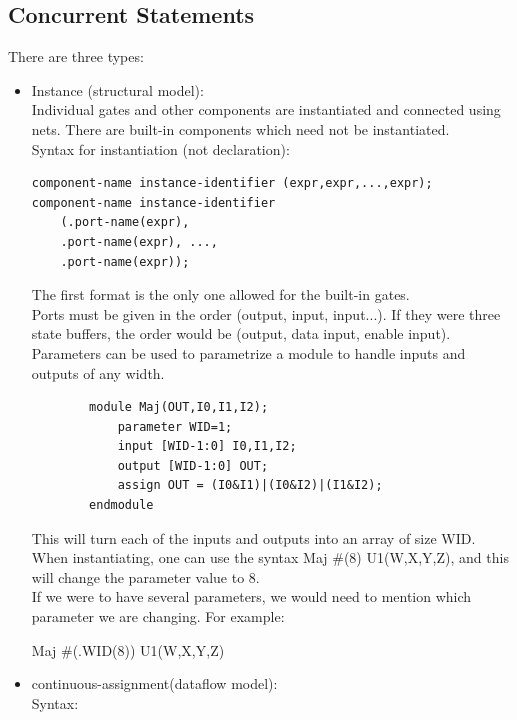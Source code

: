 \documentclass[nobib]{tufte-handout}
\begin{document}
    \subsection{Concurrent Statements}
    There are three types:\\
    \begin{itemize}
        \item Instance (structural model):\\ Individual gates and other components are
              instantiated and connected using nets. There are built-in components which need
              not be instantiated.\\ Syntax for instantiation (not declaration):
              \begin{lstlisting}
component-name instance-identifier (expr,expr,...,expr);
component-name instance-identifier
    (.port-name(expr),
    .port-name(expr), ...,
    .port-name(expr));
    \end{lstlisting}
              The first format is the only one allowed for the built-in gates.\\ Ports must
              be given in the order (output, input, input...). If they were three state
              buffers, the order would be (output, data input, enable input).\\ Parameters
              can be used to parametrize a module to handle inputs and outputs of any width.
              \begin{lstlisting}
        module Maj(OUT,I0,I1,I2);
            parameter WID=1;
            input [WID-1:0] I0,I1,I2;
            output [WID-1:0] OUT;
            assign OUT = (I0&I1)|(I0&I2)|(I1&I2);
        endmodule
    \end{lstlisting}
              This will turn each of the inputs and outputs into an array of size WID.\\ When
              instantiating, one can use the syntax Maj \#(8) U1(W,X,Y,Z), and this will
              change the parameter value to 8.\\ If we were to have several parameters, we
              would need to mention which parameter we are changing. For example:\\
              \begin{center}
                  Maj \#(.WID(8)) U1(W,X,Y,Z)
              \end{center}
        \item continuous-assignment(dataflow model):\\ Syntax:
              \begin{lstlisting}

\end{lstlisting}
\end{itemize}
\end{document}
